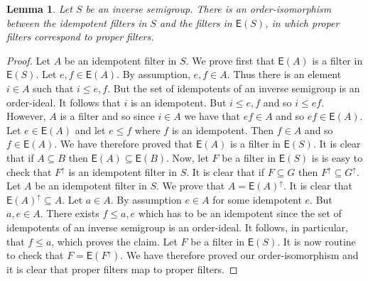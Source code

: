 \documentclass[a4paper]{amsart}
\newtheorem{lemma}[theorem]{Lemma}
\begin{document}
\begin{lemma}\label{lem:idempotent-filter} Let $S$ be an inverse semigroup.
There is an order-isomorphism between the idempotent filters in $S$ and the filters in $\mathsf{E}(S)$,
in which proper filters correspond to proper filters.
\end{lemma}
\begin{proof}  Let $A$ be an idempotent filter in $S$.
We prove first that $\mathsf{E}(A)$ is a filter in $\mathsf{E}(S)$. 
Let $e,f \in \mathsf{E}(A)$.
By assumption, $e,f \in A$.
Thus there is an element $i \in A$ such that $i \leq e,f$.
But the set of idempotents of an inverse semigroup is an order-ideal.
It follows that $i$ is an idempotent.
But $i \leq e,f$ and so $i \leq ef$.
However, $A$ is a filter and so since $i \in A$ we have that $ef \in A$ and so $ef \in \mathsf{E}(A)$.
Let $e \in \mathsf{E}(A)$ and let $e \leq f$ where $f$ is an idempotent.
Then $f \in A$ and so $f \in \mathsf{E}(A)$.
We have therefore proved that $\mathsf{E}(A)$ is a filter in $\mathsf{E}(S)$.
It is clear that if $A \subseteq B$ then $\mathsf{E}(A) \subseteq \mathsf{E}(B)$.
Now, let $F$ be a filter in $\mathsf{E}(S)$ is is easy to check that $F^{\uparrow}$ is 
an idempotent filter in $S$.
It is clear that if $F \subseteq G$ then $F^{\uparrow} \subseteq G^{\uparrow}$.
Let $A$ be an idempotent filter in $S$.
We prove that $A = \mathsf{E}(A)^{\uparrow}$.  
It is clear that $\mathsf{E}(A)^{\uparrow} \subseteq A$.
Let $a \in A$.
By assumption $e \in A$ for some idempotent $e$.
But $a,e \in A$.
There exists $f \leq a,e$ which has to be an idempotent since the set of idempotents of an inverse
semigroup is an order-ideal.
It follows, in particular, that $f \leq a$,
which proves the claim.
Let $F$ be a filter in $\mathsf{E}(S)$.
It is now routine to check that $F = \mathsf{E}(F^{\uparrow})$.
We have therefore proved our order-isomorphism and it is clear that 
proper filters map to proper filters.
\end{proof}
\end{document}

